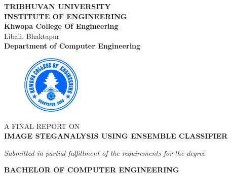\begin{center}
    \thispagestyle{empty}
    \Large\textbf{TRIBHUVAN UNIVERSITY}\\
    \Large\textbf{INSTITUTE OF ENGINEERING }\\
    \vspace{0.2in}
    \large{\textbf{Khwopa College Of Engineering}\\}
    \normalsize{Libali, Bhaktapur\\}
    \large\textbf{Department of Computer Engineering}
    \vspace{0.2in}
    \begin{figure}[h]
        \centering
            \includegraphics[width=0.25\textwidth]{img/Khwopalogo.jpg}
    \end{figure}
    
    \vspace{0.2in}
    \large{A FINAL REPORT ON\\\textbf{IMAGE STEGANALYSIS USING ENSEMBLE CLASSIFIER}\\}
    
    \vspace{0.2in}
    \large{\textit{Submitted in partial fulfillment of the requirements for the degree\\}}
    
    \vspace{0.2in}
    \large{\textbf{BACHELOR OF COMPUTER ENGINEERING}\\}
    

\end{center}
